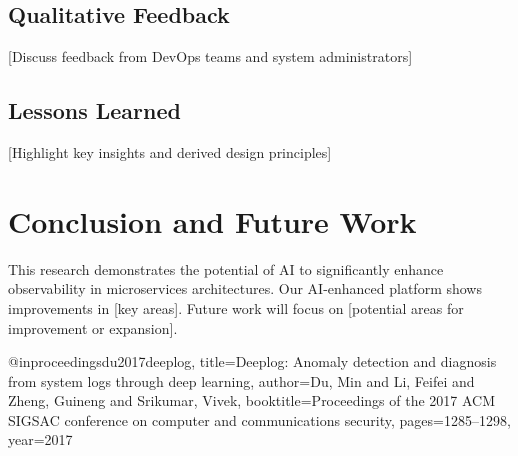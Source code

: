 \documentclass[10pt,journal,compsoc]{IEEEtran}
\begin{document}
\subsection{Qualitative Feedback}
[Discuss feedback from DevOps teams and system administrators]

\subsection{Lessons Learned}
[Highlight key insights and derived design principles]

\section{Conclusion and Future Work}
This research demonstrates the potential of AI to significantly enhance observability in microservices architectures. Our AI-enhanced platform shows improvements in [key areas]. Future work will focus on [potential areas for improvement or expansion].




@inproceedings{du2017deeplog,
  title={Deeplog: Anomaly detection and diagnosis from system logs through deep learning},
  author={Du, Min and Li, Feifei and Zheng, Guineng and Srikumar, Vivek},
  booktitle={Proceedings of the 2017 ACM SIGSAC conference on computer and communications security},
  pages={1285--1298},
  year={2017}
}
\end{document}
